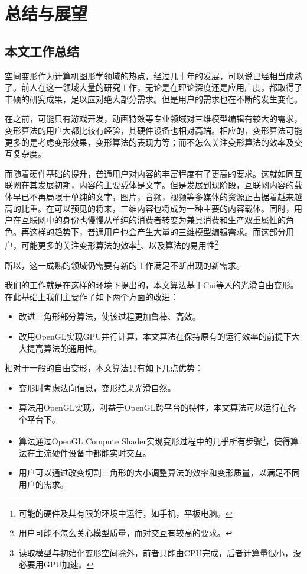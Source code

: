 \chapter{总结与展望}
\section{本文工作总结}
    空间变形作为计算机图形学领域的热点，经过几十年的发展，可以说已经相当成熟了。前人在这一领域大量的研究工作，无论是在理论深度还是应用广度，都取得了丰硕的研究成果，足以应对绝大部分需求。但是用户的需求也在不断的发生变化。

    在之前，可能只有游戏开发，动画特效等专业领域对三维模型编辑有较大的需求，变形算法的用户大都比较有经验，其硬件设备也相对高端。相应的，变形算法可能更多的是考虑变形效果，变形算法的表现力等；而不怎么关注变形算法的效率及交互复杂度。

    而随着硬件基础的提升，普通用户对内容的丰富程度有了更高的要求。这就如同互联网在其发展初期，内容的主要载体是文字。但是发展到现阶段，互联网内容的载体早已不再局限于单纯的文字，图片，音频，视频等多媒体的资源正占据着越来越高的比重。在可以预见的将来，三维内容也将成为一种主要的内容载体。同时，用户在互联网中的身份也慢慢从单纯的消费者转变为兼具消费和生产双重属性的角色。再这样的趋势下，普通用户也会产生大量的三维模型编辑需求。而这部分用户，可能更多的关注变形算法的效率\footnote{可能的硬件及其有限的环境中运行，如手机，平板电脑。}、以及算法的易用性\footnote{用户可能不怎么关心模型质量，而对交互有较高的要求。}

    所以，这一成熟的领域仍需要有新的工作满足不断出现的新需求。

    我们的工作就是在这样的环境下提出的，本文算法基于Cui等人的光滑自由变形\cite{Cui15}。在此基础上我们主要作了如下两个方面的改进：

    \begin{itemize}
        \item 改进三角形部分算法，使该过程更加鲁棒、高效。
        \item 改用OpenGL实现GPU并行计算，本文算法在保持原有的运行效率的前提下大大提高算法的通用性。
    \end{itemize}

    相对于一般的自由变形，本文算法具有如下几点优势：
    \begin{itemize}
        \item 变形时考虑法向信息，变形结果光滑自然。
        \item 算法用OpenGL实现，利益于OpenGL跨平台的特性，本文算法可以运行在各个平台下。
        \item 算法通过OpenGL Compute Shader实现变形过程中的几乎所有步骤\footnote{读取模型与初始化变形空间除外，前者只能由CPU完成，后者计算量很小，没必要用GPU加速。}，使得算法在主流硬件设备中都能实时交互。
        \item 用户可以通过改变切割三角形的大小调整算法的效率和变形质量，以满足不同用户的需求。
    \end{itemize}

